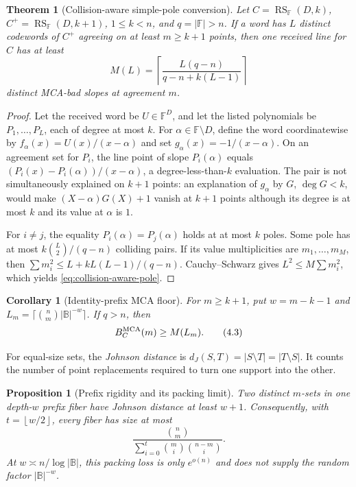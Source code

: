 \documentclass[12pt,a4paper]{amsart}
\numberwithin{equation}{section}
\newtheorem{theorem}{Theorem}[section]
\newtheorem{proposition}[proposition]{Proposition}
\newtheorem{corollary}[corollary]{Corollary}
\theoremstyle{remark}
\DeclareMathOperator{\RS}{RS}
\newcommand{\F}{\mathbb F}
\newcommand{\B}{\mathbb B}
\newcommand{\abs}[1]{\lvert #1\rvert}
\newcommand{\floor}[1]{\left\lfloor #1\right\rfloor}
\begin{document}
\begin{theorem}[Collision-aware simple-pole conversion]
\label{thm:collision-aware-pole}
Let \(C=\RS_\F(D,k)\), \(C^+=\RS_\F(D,k+1)\), \(1\le k<n\), and
\(q=\abs\F>n\).  If a word has \(L\) distinct codewords of \(C^+\)
agreeing on at least \(m\ge k+1\) points, then one received line for \(C\)
has at least
\[
 M(L)=\left\lceil
 \frac{L(q-n)}{q-n+k(L-1)}
 \right\rceil
 \tag{4.2}\label{eq:collision-aware-pole}
\]
distinct MCA-bad slopes at agreement \(m\).
\end{theorem}

\begin{proof}
Let the received word be \(U\in\F^D\), and let the listed polynomials be
\(P_1,\ldots,P_L\), each of degree at most \(k\).  For
\(\alpha\in\F\setminus D\), define the word coordinatewise by
\(f_\alpha(x)=U(x)/(x-\alpha)\) and set
\(g_\alpha(x)=-1/(x-\alpha)\).  On an agreement set for \(P_i\), the line
point of slope \(P_i(\alpha)\) equals
\((P_i(x)-P_i(\alpha))/(x-\alpha)\), a degree-less-than-\(k\) evaluation.
The pair is not simultaneously explained on \(k+1\) points: an explanation
of \(g_\alpha\) by \(G\), \(\deg G<k\), would make
\((X-\alpha)G(X)+1\) vanish at \(k+1\) points although its degree is at
most \(k\) and its value at \(\alpha\) is \(1\).

For \(i\ne j\), the equality \(P_i(\alpha)=P_j(\alpha)\) holds at at most
\(k\) poles.  Some pole has at most \(k\binom L2/(q-n)\) colliding pairs.
If its value multiplicities are \(m_1,\ldots,m_M\), then
\(\sum m_i^2\le L+kL(L-1)/(q-n)\).  Cauchy--Schwarz gives
\(L^2\le M\sum m_i^2\), which yields \eqref{eq:collision-aware-pole}.
\end{proof}

\begin{corollary}[Identity-prefix MCA floor]\label{cor:identity-prefix-floor}
For \(m\ge k+1\), put \(w=m-k-1\) and
\(L_m=\lceil\binom nm\abs\B^{-w}\rceil\).  If \(q>n\), then
\[
 B_C^{\rm MCA}(m)\ge M(L_m).
 \tag{4.3}\label{eq:identity-prefix-floor}
\]
\end{corollary}

For equal-size sets, the \emph{Johnson distance} is
\(d_J(S,T)=\abs{S\setminus T}=\abs{T\setminus S}\).  It counts the
number of point replacements required to turn one support into the other.

\begin{proposition}[Prefix rigidity and its packing limit]
\label{prop:prefix-rigidity-full}
Two distinct \(m\)-sets in one depth-\(w\) prefix fiber have Johnson
distance at least \(w+1\).  Consequently, with
\(t=\floor{w/2}\), every fiber has size at most
\[
 \frac{\binom nm}{\sum_{i=0}^t\binom mi\binom{n-m}{i}}.
 \tag{4.4}\label{eq:packing-fiber-cap}
\]
At \(w\asymp n/\log\abs\B\), this packing loss is only
\(e^{o(n)}\) and does not supply the random factor \(\abs\B^{-w}\).
\end{proposition}
\end{document}
